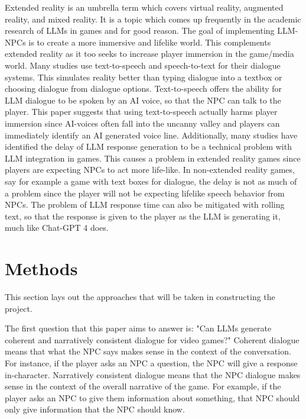\documentclass[10pt,twocolumn]{article}
\begin{document}
            \par
            Extended reality is an umbrella term which covers virtual reality, augmented reality, and mixed reality. It is a topic which comes up frequently in the academic research of LLMs in games and for good reason. The goal of implementing LLM-NPCs is to create a more immersive and lifelike world\cite{christiansen_exploring_2024}. This complements extended reality as it too seeks to increase player immersion in the game/media world. Many studies use text-to-speech and speech-to-text for their dialogue systems. This simulates reality better than typing dialogue into a textbox or choosing dialogue from dialogue options. Text-to-speech offers the ability for LLM dialogue to be spoken by an AI voice, so that the NPC can talk to the player. This paper suggests that using text-to-speech actually harms player immersion since AI-voices often fall into the uncanny valley and players can immediately identify an AI generated voice line. Additionally, many studies have identified the delay of LLM response generation to be a technical problem with LLM integration in games. This causes a problem in extended reality games since players are expecting NPCs to act more life-like. In non-extended reality games, say for example a game with text boxes for dialogue, the delay is not as much of a problem since the player will not be expecting lifelike speech behavior from NPCs. The problem of LLM response time can also be mitigated with rolling text, so that the response is given to the player as the LLM is generating it, much like Chat-GPT 4 does.

\section{Methods}

    \par
    This section lays out the approaches that will be taken in constructing the project. 

    \par 
    The first question that this paper aims to answer is: "Can LLMs generate coherent and narratively consistent dialogue for video games?" Coherent dialogue means that what the NPC says makes sense in the context of the conversation. For instance, if the player asks an NPC a question, the NPC will give a response in-character. Narratively consistent dialogue means that the NPC dialogue makes sense in the context of the overall narrative of the game. For example, if the player asks an NPC to give them information about something, that NPC should only give information that the NPC should know. 
\end{document}
